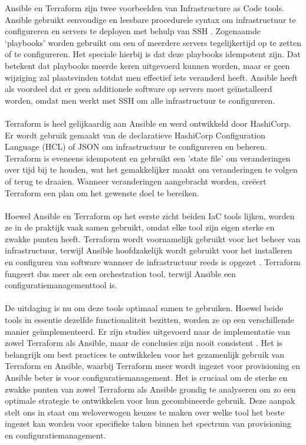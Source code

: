 Ansible en Terraform zijn twee voorbeelden van Infrastructure as Code tools. Ansible gebruikt eenvoudige en leesbare procedurele syntax om infrastructuur te configureren en servers te deployen met behulp van SSH \autocite{Geerling_2020}. Zogenaamde ‘playbooks’ worden gebruikt om een of meerdere servers tegelijkertijd op te zetten of te configureren. Het speciale hierbij is dat deze playbooks idempotent zijn. Dat betekent dat playbooks meerde keren uitgevoerd kunnen worden, maar er geen wijziging zal plaatsvinden totdat men effectief iets veranderd heeft. Ansible heeft als voordeel dat er geen additionele software op servers moet geïnstalleerd worden, omdat men werkt met SSH om alle infrastructuur te configureren. \\\\

Terraform is heel gelijkaardig aan Ansible en werd ontwikkeld door HashiCorp. Er wordt gebruik gemaakt van de declaratieve HashiCorp Configuration Language (HCL) of JSON om infrastructuur te configureren en beheren. Terraform is eveneens idempotent en gebruikt een 'state file' om veranderingen over tijd bij te houden, wat het gemakkelijker maakt om veranderingen te volgen of terug te draaien. Wanneer veranderingen aangebracht worden, creëert Terraform een plan om het gewenste doel te bereiken. \\\\

Hoewel Ansible en Terraform op het eerste zicht beiden IaC tools lijken, worden ze in de praktijk vaak samen gebruikt, omdat elke tool zijn eigen sterke en zwakke punten heeft. Terraform wordt voornamelijk gebruikt voor het beheer van infrastructuur, terwijl Ansible hoofdzakelijk wordt gebruikt voor het installeren en configuren van software wanneer de infrastructuur reeds is opgezet \autocite{Ninawe_2023} . Terraform fungeert dus meer als een orchestration tool, terwijl Ansible een configuratiemanagementtool is. \\\\

De uitdaging is nu om deze tools optimaal samen te gebruiken. Hoewel beide tools in essentie dezelfde functionaliteit bezitten, worden ze op een verschillende manier geïmplementeerd. Er zijn studies uitgevoerd naar de implementatie van zowel Terraform als Ansible, maar de conclusies zijn nooit consistent \autocite{Gurbatov_2022}. Het is belangrijk om best practices te ontwikkelen voor het gezamenlijk gebruik van Terraform en Ansible, waarbij Terraform meer wordt ingezet voor provisioning en Ansible beter is voor configuratiemanagement. Het is cruciaal om de sterke en zwakke punten van zowel Terraform als Ansible grondig te analyseren om zo een optimale strategie te ontwikkelen voor hun gecombineerde gebruik. Deze aanpak stelt ons in staat om weloverwogen keuzes te maken over welke tool het beste ingezet kan worden voor specifieke taken binnen het spectrum van provisioning en configuratiemanagement. \\\\

